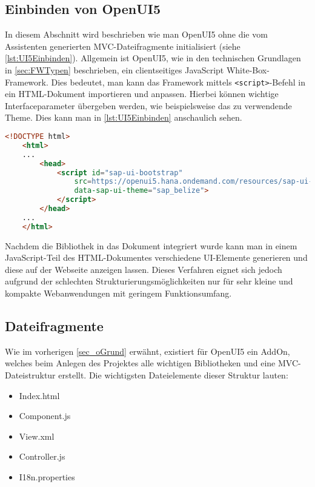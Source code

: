\subsection{Einbinden von OpenUI5}\label{sec_oGrund}

In diesem Abschnitt wird beschrieben wie man OpenUI5 ohne die vom Assistenten generierten MVC-Dateifragmente initialisiert (siehe \autoref{lst:UI5Einbinden}). Allgemein ist OpenUI5, wie in den technischen Grundlagen in \autoref{sec:FWTypen} beschrieben, ein clientseitiges JavaScript White-Box-Framework. Dies bedeutet, man kann das Framework mittels \texttt{<script>}-Befehl in ein HTML-Dokument importieren und anpassen. Hierbei können wichtige Interfaceparameter übergeben werden, wie beispielsweise das zu verwendende Theme. Dies kann man in \autoref{lst:UI5Einbinden} anschaulich sehen.

\begin{lstlisting}[caption=Beispiel für das Einbinden von OpenUI5, label=lst:UI5Einbinden, language=HTML]
<!DOCTYPE html>
	<html>
	...
		<head>
			<script id="sap-ui-bootstrap"
				src=https://openui5.hana.ondemand.com/resources/sap-ui-core.js
				data-sap-ui-theme="sap_belize">
			</script>
		</head>
	...
	</html>
\end{lstlisting}

Nachdem die Bibliothek in das Dokument integriert wurde kann man in einem JavaScript-Teil des HTML-Dokumentes verschiedene UI-Elemente generieren und diese auf der Webseite anzeigen lassen. Dieses Verfahren eignet sich jedoch aufgrund der schlechten Strukturierungsmöglichkeiten nur für sehr kleine und kompakte Webanwendungen mit geringem Funktionsumfang.\autocites[vgl.][136\psqq]{Antolovic2014}

\subsection{Dateifragmente}\label{sec:oDateien}

Wie im vorherigen \autoref{sec_oGrund} erwähnt, existiert für OpenUI5 ein AddOn, welches beim Anlegen des Projektes alle wichtigen Bibliotheken und eine MVC-Dateistruktur erstellt. Die wichtigsten Dateielemente dieser Struktur lauten:

\begin{itemize}
	\item Index.html
	\item Component.js
	\item View.xml
	\item Controller.js
	\item I18n.properties
\end{itemize}

